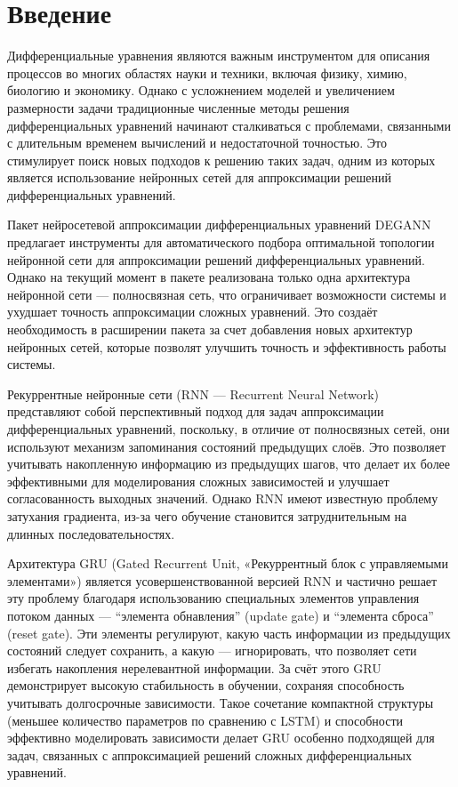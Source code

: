 
\section*{Введение}
\thispagestyle{withCompileDate}

Дифференциальные уравнения  являются важным инструментом для описания процессов во многих областях науки и техники, включая физику, химию, биологию и экономику. Однако с усложнением моделей и увеличением размерности задачи традиционные численные методы решения дифференциальных уравнений начинают сталкиваться с проблемами, связанными с длительным временем вычислений и недостаточной точностью. Это стимулирует поиск новых подходов к решению таких задач, одним из которых является использование нейронных сетей для аппроксимации решений дифференциальных уравнений.

Пакет нейросетевой аппроксимации дифференциальных уравнений DEGANN предлагает инструменты для автоматического подбора оптимальной топологии нейронной сети для аппроксимации решений дифференциальных уравнений. Однако на текущий момент в пакете реализована только одна архитектура нейронной сети — полносвязная сеть, что ограничивает возможности системы и ухудшает точность аппроксимации сложных уравнений. Это создаёт необходимость в расширении пакета за счет добавления новых архитектур нейронных сетей, которые позволят улучшить точность и эффективность работы системы.

Рекуррентные нейронные сети (RNN — Recurrent Neural Network) представляют собой перспективный подход для задач аппроксимации дифференциальных уравнений, поскольку, в отличие от полносвязных сетей, они используют механизм запоминания состояний предыдущих слоёв. Это позволяет учитывать накопленную информацию из предыдущих шагов, что делает их более эффективными для моделирования сложных зависимостей и улучшает согласованность выходных значений. Однако RNN имеют известную проблему затухания градиента, из-за чего обучение становится затруднительным на длинных последовательностях.

Архитектура GRU (Gated Recurrent Unit, «Рекуррентный блок с управляемыми элементами») является усовершенствованной версией RNN и частично решает эту проблему благодаря использованию специальных элементов управления потоком данных — “элемента обнавления” (update gate) и “элемента сброса” (reset gate). Эти элементы регулируют, какую часть информации из предыдущих состояний следует сохранить, а какую — игнорировать, что позволяет сети избегать накопления нерелевантной информации. За счёт этого GRU демонстрирует высокую стабильность в обучении, сохраняя способность учитывать долгосрочные зависимости. Такое сочетание компактной структуры (меньшее количество параметров по сравнению с LSTM) и способности эффективно моделировать зависимости делает GRU особенно подходящей для задач, связанных с аппроксимацией решений сложных дифференциальных уравнений.

